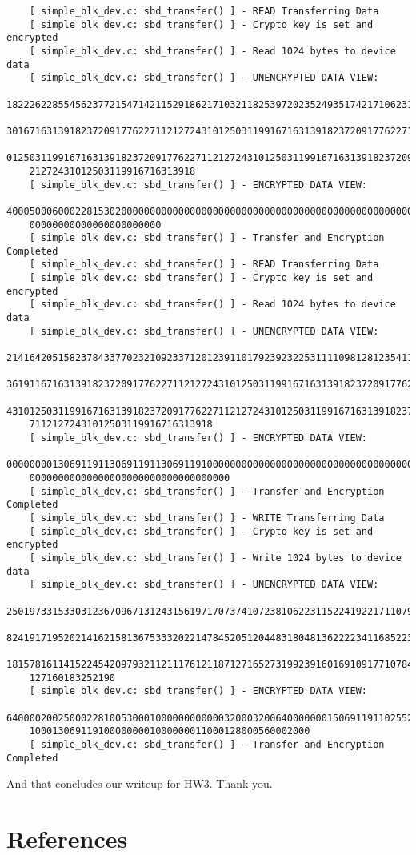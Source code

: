 \documentclass[onecolumn, draftclsnofoot,10pt, compsoc]{IEEEtran}
\begin{document}
\begin{enumerate}
\begin{lstlisting}
    [ simple_blk_dev.c: sbd_transfer() ] - READ Transferring Data
    [ simple_blk_dev.c: sbd_transfer() ] - Crypto key is set and encrypted
    [ simple_blk_dev.c: sbd_transfer() ] - Read 1024 bytes to device data
    [ simple_blk_dev.c: sbd_transfer() ] - UNENCRYPTED DATA VIEW:
    18222622855456237721547142115291862171032118253972023524935174217106231551961951
    30167163139182372091776227112127243101250311991671631391823720917762271121272431
    01250311991671631391823720917762271121272431012503119916716313918237209177622711
    21272431012503119916716313918
    [ simple_blk_dev.c: sbd_transfer() ] - ENCRYPTED DATA VIEW:
    40005000600022815302000000000000000000000000000000000000000000000000000000000000
    00000000000000000000000
    [ simple_blk_dev.c: sbd_transfer() ] - Transfer and Encryption Completed
    [ simple_blk_dev.c: sbd_transfer() ] - READ Transferring Data
    [ simple_blk_dev.c: sbd_transfer() ] - Crypto key is set and encrypted
    [ simple_blk_dev.c: sbd_transfer() ] - Read 1024 bytes to device data
    [ simple_blk_dev.c: sbd_transfer() ] - UNENCRYPTED DATA VIEW:
    21416420515823784337702321092337120123911017923923225311110981281235411121113249
    36191167163139182372091776227112127243101250311991671631391823720917762271121272
    43101250311991671631391823720917762271121272431012503119916716313918237209177622
    71121272431012503119916716313918
    [ simple_blk_dev.c: sbd_transfer() ] - ENCRYPTED DATA VIEW:
    00000000130691191130691191130691191000000000000000000000000000000000000000000000
    00000000000000000000000000000000000
    [ simple_blk_dev.c: sbd_transfer() ] - Transfer and Encryption Completed
    [ simple_blk_dev.c: sbd_transfer() ] - WRITE Transferring Data
    [ simple_blk_dev.c: sbd_transfer() ] - Crypto key is set and encrypted
    [ simple_blk_dev.c: sbd_transfer() ] - Write 1024 bytes to device data
    [ simple_blk_dev.c: sbd_transfer() ] - UNENCRYPTED DATA VIEW:
    25019733153303123670967131243156197170737410723810622311522419221711079158017775
    82419171952021416215813675333202214784520512044831804813622223411685223249220910
    18157816114152245420979321121117612118712716527319923916016910917710784152190191
    127160183252190
    [ simple_blk_dev.c: sbd_transfer() ] - ENCRYPTED DATA VIEW:
    64000020025000228100530001000000000000320003200640000000150691191102552558323900
    1000130691191000000001000000011000128000560002000
    [ simple_blk_dev.c: sbd_transfer() ] - Transfer and Encryption Completed
\end{lstlisting}

    And that concludes our writeup for HW3. Thank you. 
  
\end{enumerate}


\section{References}
  

\end{document}
